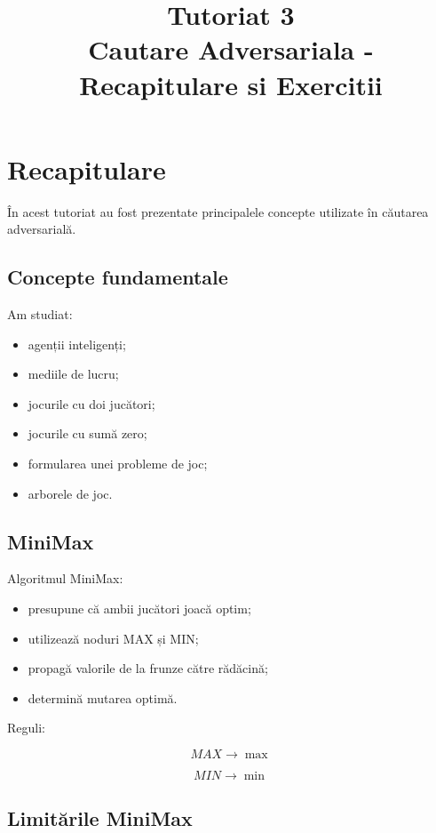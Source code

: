 \documentclass[12pt,a4paper]{article}
\title{Tutoriat 3\\Cautare Adversariala - Recapitulare si Exercitii}
\author{}
\date{}
\begin{document}
\maketitle

\section{Recapitulare}

În acest tutoriat au fost prezentate principalele concepte utilizate în căutarea adversarială.

\subsection{Concepte fundamentale}

Am studiat:

\begin{itemize}
\item agenții inteligenți;
\item mediile de lucru;
\item jocurile cu doi jucători;
\item jocurile cu sumă zero;
\item formularea unei probleme de joc;
\item arborele de joc.
\end{itemize}

\subsection{MiniMax}

Algoritmul MiniMax:

\begin{itemize}
\item presupune că ambii jucători joacă optim;
\item utilizează noduri MAX și MIN;
\item propagă valorile de la frunze către rădăcină;
\item determină mutarea optimă.
\end{itemize}

Reguli:

\[
MAX \rightarrow \max
\]

\[
MIN \rightarrow \min
\]

\subsection{Limitările MiniMax}
\end{document}
